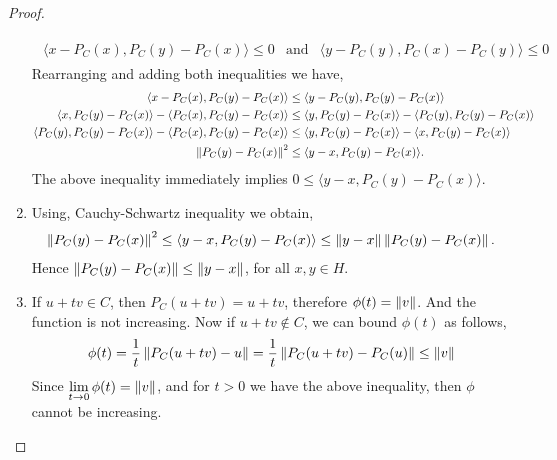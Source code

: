 \begin{lemma}
\begin{proof}
\begin{enumerate}
		\begin{align*}
			\begin{array}{ccc}
			\langle x-P_C(x), P_C(y)-P_C(x)\rangle \leq 0 & \text{and}
			&\langle y-P_C(y), P_C(x)-P_C(y)\rangle \leq 0
			\end{array}			
		\end{align*}
		Rearranging and adding both inequalities we have,
		\begin{align*}
		\langle x-P_C(x), P_C(y)-P_C(x)\rangle &\leq 
		\langle y-P_C(y), P_C(y)-P_C(x)\rangle \\
		\langle x, P_C(y)-P_C(x)\rangle -\langle P_C(x), P_C(y)-P_C(x)\rangle&\leq \langle y, P_C(y)-P_C(x)\rangle -\langle P_C(y), P_C(y)-P_C(x)\rangle \\
		\langle P_C(y), P_C(y)-P_C(x)\rangle -\langle P_C(x), P_C(y)-P_C(x)\rangle&\leq \langle y, P_C(y)-P_C(x)\rangle -\langle x, P_C(y)-P_C(x)\rangle \\
		\left\lVert P_C(y)-P_C(x)\right\rVert^2&\leq \langle y-x, P_C(y)-P_C(x)\rangle.
		\end{align*}
		The above inequality immediately implies $0\leq \langle y-x, P_C(y)-P_C(x)\rangle$.
		\item Using, Cauchy-Schwartz inequality we obtain,
		\begin{align*}
		\left\lVert P_C(y)-P_C(x)\right\rVert^2\leq \langle y-x, P_C(y)-P_C(x)\rangle\leq \left\lVert y-x\right\rVert \left\lVert P_C(y)-P_C(x)\right\rVert.
		\end{align*}
		Hence $\left\lVert P_C(y)-P_C(x)\right\rVert\leq \left\lVert y-x\right\rVert$, for all $x,y \in H$.
		\item If $u+tv \in C$, then $P_C(u+tv)=u+tv$, therefore $\phi(t)= \left\lVert v\right\rVert$. And the function is not increasing. Now if $u+tv \notin C$, we can bound $\phi(t)$ as follows,
		\[
			\phi(t)=\frac{1}{t}\left\lVert P_C(u+tv)-u\right\rVert=\frac{1}{t}\left\lVert P_C(u+tv)-P_C(u)\right\rVert \leq \left\lVert v\right\rVert
		\]
		Since $\underset{t\rightarrow 0}{\lim}\, \phi(t) = \left\lVert v\right\rVert$, and for $t>0$ we have the above inequality, then $\phi$ cannot be increasing.
	\end{enumerate}
\end{proof}
\end{lemma}

